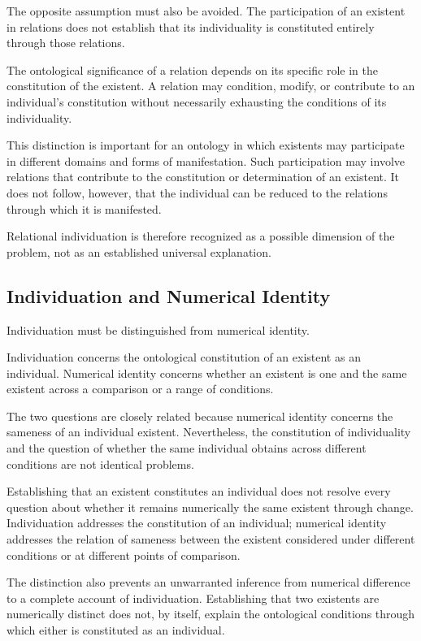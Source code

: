 The opposite assumption must also be avoided. The participation
of an existent in relations does not establish that its
individuality is constituted entirely through those relations.

The ontological significance of a relation depends on its
specific role in the constitution of the existent. A relation
may condition, modify, or contribute to an individual's
constitution without necessarily exhausting the conditions
of its individuality.

This distinction is important for an ontology in which
existents may participate in different domains and forms
of manifestation. Such participation may involve relations
that contribute to the constitution or determination of
an existent. It does not follow, however, that the individual
can be reduced to the relations through which it is manifested.

Relational individuation is therefore recognized as a possible
dimension of the problem, not as an established universal
explanation.

\subsection{Individuation and Numerical Identity}

Individuation must be distinguished from numerical identity.

Individuation concerns the ontological constitution of an
existent as an individual. Numerical identity concerns
whether an existent is one and the same existent across
a comparison or a range of conditions.

The two questions are closely related because numerical
identity concerns the sameness of an individual existent.
Nevertheless, the constitution of individuality and the
question of whether the same individual obtains across
different conditions are not identical problems.

Establishing that an existent constitutes an individual
does not resolve every question about whether it remains
numerically the same existent through change. Individuation
addresses the constitution of an individual; numerical
identity addresses the relation of sameness between the
existent considered under different conditions or at
different points of comparison.

The distinction also prevents an unwarranted inference
from numerical difference to a complete account of
individuation. Establishing that two existents are
numerically distinct does not, by itself, explain the
ontological conditions through which either is constituted
as an individual.

